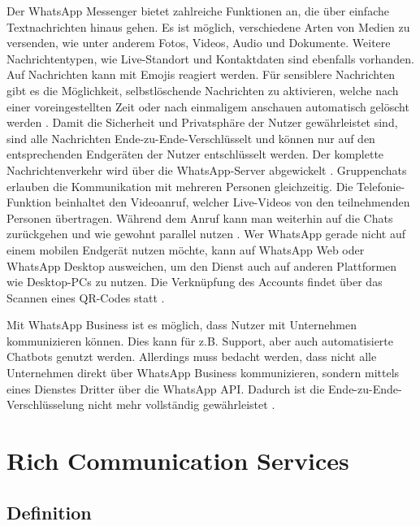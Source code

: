 \documentclass[conference]{IEEEtran}
\begin{document}
Der WhatsApp Messenger bietet zahlreiche Funktionen an, die über einfache Textnachrichten hinaus gehen.
Es ist möglich, verschiedene Arten von Medien zu versenden, wie unter anderem Fotos, Videos, Audio und Dokumente.
Weitere Nachrichtentypen, wie Live-Standort und Kontaktdaten sind ebenfalls vorhanden.
Auf Nachrichten kann mit Emojis reagiert werden.
Für sensiblere Nachrichten gibt es die Möglichkeit, selbstlöschende Nachrichten zu aktivieren, welche nach einer voreingestellten Zeit oder nach einmaligem anschauen automatisch gelöscht werden \cite{wafaq}.
Damit die Sicherheit und Privatsphäre der Nutzer gewährleistet sind, sind alle Nachrichten Ende-zu-Ende-Verschlüsselt und können nur auf den entsprechenden Endgeräten der Nutzer entschlüsselt werden.
Der komplette Nachrichtenverkehr wird über die WhatsApp-Server abgewickelt \cite{waencryption}.
Gruppenchats erlauben die Kommunikation mit mehreren Personen gleichzeitig. Die Telefonie-Funktion beinhaltet den Videoanruf, welcher Live-Videos von den teilnehmenden Personen übertragen. Während dem Anruf kann man weiterhin auf die Chats zurückgehen und wie gewohnt parallel nutzen \cite{wafaq}.
Wer WhatsApp gerade nicht auf einem mobilen Endgerät nutzen möchte, kann auf WhatsApp Web oder WhatsApp Desktop ausweichen, um den Dienst auch auf anderen Plattformen wie Desktop-PCs zu nutzen.
Die Verknüpfung des Accounts findet über das Scannen eines QR-Codes statt \cite{wafaq,waencryption}.

Mit WhatsApp Business ist es möglich, dass Nutzer mit Unternehmen kommunizieren können. Dies kann für z.B. Support, aber auch automatisierte Chatbots genutzt werden. Allerdings muss bedacht werden, dass nicht alle Unternehmen direkt über WhatsApp Business kommunizieren, sondern mittels eines Dienstes Dritter über die WhatsApp API. Dadurch ist die Ende-zu-Ende-Verschlüsselung nicht mehr vollständig gewährleistet \cite{waencryption}.


\section{Rich Communication Services}

\subsection{Definition}
\end{document}
